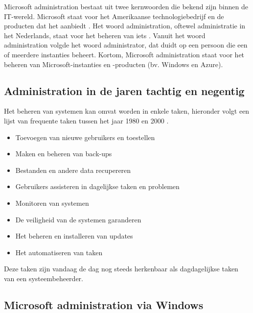 
Microsoft administration bestaat uit twee kernwoorden die bekend zijn binnen de \ac{IT}-wereld. Microsoft staat voor het Amerikaanse technologiebedrijf en de producten dat het aanbiedt \autocite{Warner2019}. Het woord administration, oftewel administratie in het Nederlands, staat voor het beheren van iets \autocite{Burgess2003}. Vanuit het woord administration volgde het woord administrator, dat duidt op een persoon die een of meerdere instanties beheert. Kortom, Microsoft administration staat voor het beheren van Microsoft-instanties en -producten (bv. Windows en Azure). 


\subsection{Administration in de jaren tachtig en negentig}


Het beheren van systemen kan omvat worden in enkele taken, hieronder volgt een lijst van frequente taken tussen het jaar 1980 en 2000 \autocite{Frisch2002}.

\begin{itemize}
    \item Toevoegen van nieuwe gebruikers en toestellen
    \item Maken en beheren van back-ups
    \item Bestanden en andere data recupereren
    \item Gebruikers assisteren in dagelijkse taken en problemen
    \item Monitoren van systemen
    \item De veiligheid van de systemen garanderen
    \item Het beheren en installeren van updates
    \item Het automatiseren van taken
\end{itemize}

Deze taken zijn vandaag de dag nog steeds herkenbaar als dagdagelijkse taken van een systeembeheerder. 

\subsection{Microsoft administration via Windows}


